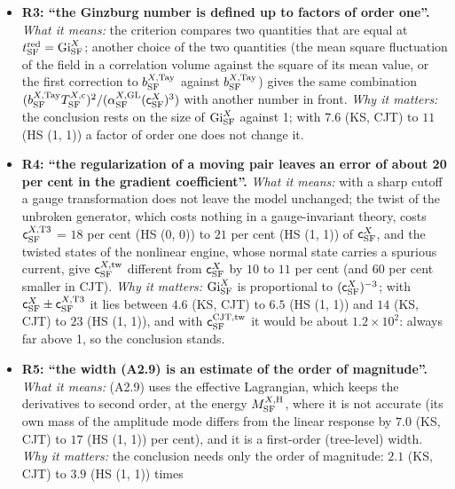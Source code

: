 \documentclass[
  10pt,
]{article}
\begin{document}
\begin{itemize}
\item
  \textbf{R3: ``the Ginzburg number is defined up to factors of order
  one''.} \emph{What it means:} the criterion compares two quantities
  that are equal at \(t^{\rm red}_{\rm SF}={\rm Gi}^{X}_{\rm SF}\);
  another choice of the two quantities (the mean square fluctuation of
  the field in a correlation volume against the square of its mean
  value, or the first correction to \(b^{X,{\rm Tay}}_{\rm SF}\) against
  \(b^{X,{\rm Tay}}_{\rm SF}\)) gives the same combination
  \((b^{X,{\rm Tay}}_{\rm SF}T^{X,{\rm c}}_{\rm SF})^2/(\alpha^{X,{\rm GL}}_{\rm SF}(\mathsf c^X_{\rm SF})^3)\)
  with another number in front. \emph{Why it matters:} the conclusion
  rests on the size of \({\rm Gi}^{X}_{\rm SF}\) against 1; with \(7.6\)
  (KS, CJT) to \(11\) (HS (1, 1)) a factor of order one does not change
  it.
\item
  \textbf{R4: ``the regularization of a moving pair leaves an error of
  about 20 per cent in the gradient coefficient''.} \emph{What it
  means:} with a sharp cutoff a gauge transformation does not leave the
  model unchanged; the twist of the unbroken generator, which costs
  nothing in a gauge-invariant theory, costs
  \(\mathsf c^{X,{\rm T3}}_{\rm SF}\) = \(18\) per cent (HS (0, 0)) to
  \(21\) per cent (HS (1, 1)) of \(\mathsf c^X_{\rm SF}\), and the
  twisted states of the nonlinear engine, whose normal state carries a
  spurious current, give \(\mathsf c^{X,{\rm tw}}_{\rm SF}\) different
  from \(\mathsf c^X_{\rm SF}\) by \(10\) to \(11\) per cent (and \(60\)
  per cent smaller in CJT). \emph{Why it matters:}
  \({\rm Gi}^{X}_{\rm SF}\) is proportional to
  \((\mathsf c^X_{\rm SF})^{-3}\); with
  \(\mathsf c^X_{\rm SF}\pm\mathsf c^{X,{\rm T3}}_{\rm SF}\) it lies
  between \(4.6\) (KS, CJT) to \(6.5\) (HS (1, 1)) and \(14\) (KS, CJT)
  to \(23\) (HS (1, 1)), and with \(\mathsf c^{\rm CJT,tw}_{\rm SF}\) it
  would be about \(1.2\times10^{2}\): always far above 1, so the
  conclusion stands.
\item
  \textbf{R5: ``the width (A2.9) is an estimate of the order of
  magnitude''.} \emph{What it means:} (A2.9) uses the effective
  Lagrangian, which keeps the derivatives to second order, at the energy
  \(M^{X,{\rm H}}_{\rm SF}\), where it is not accurate (its own mass of
  the amplitude mode differs from the linear response by \(7.0\) (KS,
  CJT) to \(17\) (HS (1, 1)) per cent), and it is a first-order
  (tree-level) width. \emph{Why it matters:} the conclusion needs only
  the order of magnitude: \(2.1\) (KS, CJT) to \(3.9\) (HS (1, 1)) times

\end{itemize}
\end{document}
